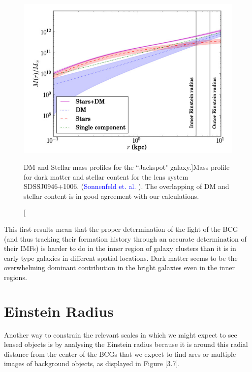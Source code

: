 \begin{figure}[H]
\centering
\includegraphics[width=12cm]{images/sonnenfeld_galaxy.png}
\caption[DM and Stellar mass profiles for the ``Jackspot" galaxy.]{Mass profile for dark matter and stellar content for the lens system SDSSJ0946+1006. (\textcolor{blue}{Sonnenfeld et. al.} \citeyear{Reference15}). The overlapping of DM and stellar content is in good agreement with our calculations.}
\end{figure}

This first results mean that the proper determination of the light of the BCG (and thus tracking their formation history through an accurate determination of their IMFs) is harder to do in the inner region of galaxy clusters than it is in early type galaxies in different spatial locations. Dark matter seems to be the overwhelming dominant contribution in the bright galaxies even in the inner regions.

\section{Einstein Radius}

Another way to constrain the relevant scales in which we might expect to see lensed objects is by analysing the Einstein radius because it is around this radial distance from the center of the BCGs that we expect to find arcs or multiple images of background objects, as displayed in Figure [3.7]. 


